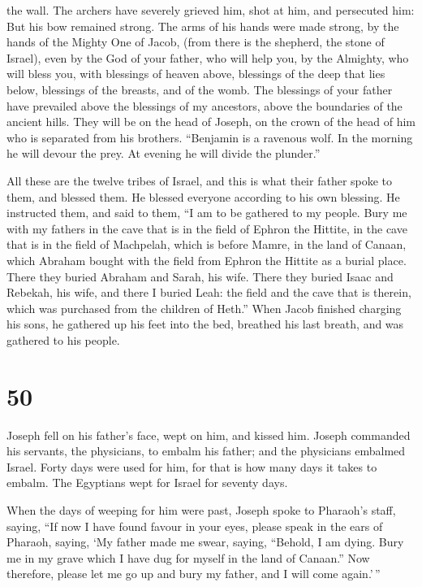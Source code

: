 the wall.  The archers have severely grieved him, shot at
him, and persecuted him:  But his bow remained strong.
The arms of his hands were made strong, by the hands of the Mighty One
of Jacob, (from there is the shepherd, the stone of Israel),
 even by the God of your father, who will help you, by
the Almighty, who will bless you, with blessings of heaven above,
blessings of the deep that lies below, blessings of the breasts, and of
the womb.  The blessings of your father have prevailed
above the blessings of my ancestors, above the boundaries of the ancient
hills. They will be on the head of Joseph, on the crown of the head of
him who is separated from his brothers.  ``Benjamin is a
ravenous wolf. In the morning he will devour the prey. At evening he
will divide the plunder.''

 All these are the twelve tribes of Israel, and this is
what their father spoke to them, and blessed them. He blessed everyone
according to his own blessing.  He instructed them, and
said to them, ``I am to be gathered to my people. Bury me with my
fathers in the cave that is in the field of Ephron the Hittite,
 in the cave that is in the field of Machpelah, which is
before Mamre, in the land of Canaan, which Abraham bought with the field
from Ephron the Hittite as a burial place.  There they
buried Abraham and Sarah, his wife. There they buried Isaac and Rebekah,
his wife, and there I buried Leah:  the field and the
cave that is therein, which was purchased from the children of Heth.''
 When Jacob finished charging his sons, he gathered up
his feet into the bed, breathed his last breath, and was gathered to his
people.

\hypertarget{section-49}{%
\section{50}\label{section-49}}

 Joseph fell on his father's face, wept on him, and kissed
him.  Joseph commanded his servants, the physicians, to
embalm his father; and the physicians embalmed Israel. 
Forty days were used for him, for that is how many days it takes to
embalm. The Egyptians wept for Israel for seventy days.

 When the days of weeping for him were past, Joseph spoke
to Pharaoh's staff, saying, ``If now I have found favour in your eyes,
please speak in the ears of Pharaoh, saying,  `My father
made me swear, saying, ``Behold, I am dying. Bury me in my grave which I
have dug for myself in the land of Canaan.'' Now therefore, please let
me go up and bury my father, and I will come again.'\,''

